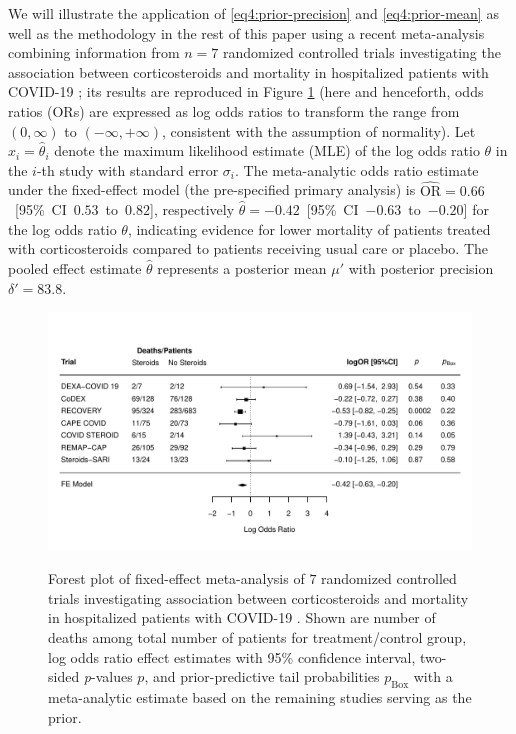 We will illustrate the application of \eqref{eq4:prior-precision} and
\eqref{eq4:prior-mean} as well as the methodology in the rest of this paper
using a recent meta-analysis combining information from $n=7$ randomized
controlled trials investigating the association between corticosteroids and
mortality in hospitalized patients with COVID-19 \citep{REACT2020}; its results
are reproduced in Figure \ref{fig4:covid19-meta} (here and henceforth, odds
ratios (ORs) are expressed as log odds ratios to transform the range from
$(0, \infty)$ to $(-\infty, +\infty)$, consistent with the assumption of
normality). Let $x_i = \hat \theta_i$ denote the maximum likelihood estimate
(MLE) of the log odds ratio $\theta$ in the $i$-th study with standard error
$\sigma_i$. The meta-analytic odds ratio estimate under the fixed-effect model
(the pre-specified primary analysis) is \mbox{$\widehat{\text{OR}} = 0.66$ [95\%
  CI $0.53$ to $0.82$]}, respectively \mbox{$\hat \theta = -0.42$ [95\% CI
  $-0.63$ to $-0.20$]} for the log odds ratio $\theta$, indicating evidence for
lower mortality of patients treated with corticosteroids compared to patients
receiving usual care or placebo. The pooled effect estimate $\hat \theta$
represents a posterior mean $\mu'$ with posterior precision $\delta'=83.8$.


\begin{figure}[!htb]
\begin{knitrout}
\color{fgcolor}
{\centering \includegraphics[width=\maxwidth]{images/paper4/forest-plot-covid19-1}
}
\end{knitrout}
\caption{Forest plot of fixed-effect meta-analysis of $7$ randomized controlled
  trials investigating association between corticosteroids and mortality in
  hospitalized patients with COVID-19 \citep{REACT2020}. Shown are number of
  deaths among total number of patients for treatment/control group, log odds
  ratio effect estimates with 95\% confidence interval, two-sided
  \textit{p}-values $p$, and prior-predictive tail probabilities
  $p_{\text{Box}}$ with a meta-analytic estimate based on the remaining studies
  serving as the prior.}
\label{fig4:covid19-meta}
\end{figure}




